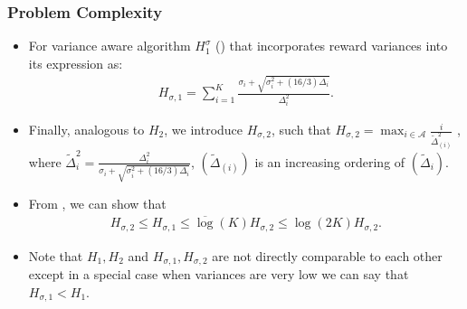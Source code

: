 \begin{frame}
\frametitle{Problem Complexity}
\begin{itemize}
\item<1-> For variance aware algorithm $H_{1}^{\sigma}$ (\cite{gabillon2011multi}) that incorporates reward variances into its expression as:
\begin{align*}
 H_{\sigma,1}=\sum_{i=1}^{K}\frac{\sigma_{i}+\sqrt{\sigma_{i}^{2}+(16/3)\Delta_{i}}}{\Delta_{i}^{2}}.
\end{align*}

\item<2-> Finally, analogous to $H_{2}$, we introduce $H_{\sigma,2}$, such that $
H_{\sigma,2}=\max_{i\in \mathcal{A}} \frac{i}{\tilde{\Delta}_{(i)}^{2}}$ , where $\tilde{\Delta}_{i}^{2}=\frac{\Delta_{i}^{2}}{\sigma_{i}+\sqrt{\sigma_{i}^{2}+(16/3)\Delta_{i}}}$,  $(\tilde{\Delta}_{(i)})$ is an increasing ordering of $(\tilde{\Delta}_{i})$.

\item<3-> From \cite{audibert2010best}, we can show that
\begin{align*}
H_{\sigma,2}\le H_{\sigma,1}\le\overline{\log}(K) H_{\sigma,2} \le \log(2K) H_{\sigma,2}.
\end{align*}


\item<4-> Note that $H_1 , H_2 $ and $H_{\sigma,1}, H_{\sigma,2}$ are not directly comparable to each other except in a special case when variances are very low we can say that $H_{\sigma,1} < H_{1} $.

\end{itemize}
\end{frame}